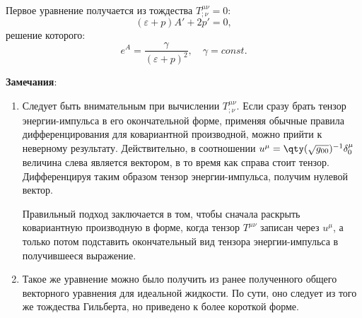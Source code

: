 \documentclass[\docroot/reports/draft/report.tex]{subfiles}
\begin{document}
    Первое уравнение получается из тождества $T^{\mu\nu}_{;\nu} = 0$:
    \begin{equation}
        (\varepsilon + p) A' + 2 p' = 0 ,
    \end{equation}
    решение которого:
    \begin{equation}
        e^{A} = \frac{\gamma}{(\varepsilon + p)^2} , \quad \gamma = const .
    \end{equation}

    \begin{footnotesize}
        \textbf{Замечания}:
        \begin{enumerate}
            \item Следует быть внимательным при вычислении $T^{\mu\nu}_{;\nu}$. Если сразу брать тензор энергии-импульса в его окончательной форме, применяя обычные правила дифференцирования для ковариантной производной, можно прийти к неверному результату. Действительно, в соотношении $u^\mu = \qty(\sqrt{g_{00}})^{-1} \delta^\mu_0$ величина слева является вектором, в то время как справа стоит тензор. Дифференцируя таким образом тензор энергии-импульса, получим нулевой вектор.

            Правильный подход заключается в том, чтобы сначала раскрыть ковариантную производную в форме, когда тензор $T^{\mu\nu}$ записан через $u^\mu$, а только потом подставить окончательный вид тензора энергии-импульса в получившееся выражение.

            \item Такое же уравнение можно было получить из ранее полученного общего векторного уравнения для идеальной жидкости. По сути, оно следует из того же тождества Гильберта, но приведено к более короткой форме.
        \end{enumerate}
    \end{footnotesize}
\end{document}
